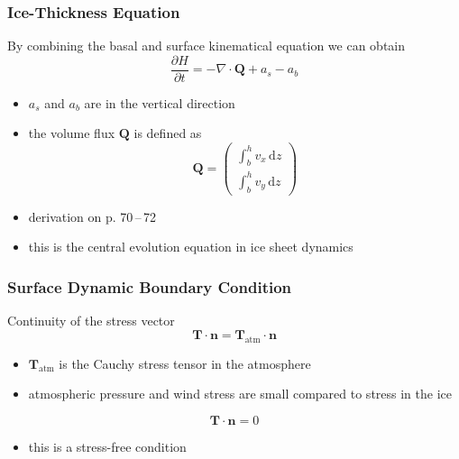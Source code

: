 \documentclass[hide notes,intlimits]{beamer}
\begin{document}
\begin{frame}
  \frametitle{Ice-Thickness Equation}
  By combining the basal and surface kinematical equation we can obtain
  \begin{equation}
    \frac{\partial H}{\partial t} = - \nabla \cdot \mathbf{Q} + a_{s} - a_{b}
  \end{equation}
    \begin{itemize}
    \item $ a_{s}$ and $a_{b}$ are in the vertical direction
    \item the volume flux $\mathbf{Q}$ is defined as
      \begin{equation*}
        \mathbf{Q} =
        \left(
          \begin{array}{c}
            \int_{b}^{h} v_{x} \,\text{d} z \\[.25em]
          \int_{b}^{h} v_{y} \,\text{d} z
        \end{array}
      \right)
    \end{equation*}
  \item derivation on p. 70\,--\,72
  \item this is the central evolution equation in ice sheet dynamics
  \end{itemize}
\end{frame}





\begin{frame}
  \frametitle{Surface Dynamic Boundary Condition}
  Continuity of the stress vector
  \begin{equation}
    \mathbf{T}\cdot\mathbf{n} = \mathbf{T}_{\text{atm}}\cdot\mathbf{n}
  \end{equation}
  \begin{itemize}
  \item $\mathbf{T}_{\text{atm}}$ is the Cauchy stress tensor in the atmosphere
  \item atmospheric pressure and wind stress are small compared to stress in the ice
  \end{itemize}
  \begin{equation}
    \mathbf{T}\cdot\mathbf{n} = 0
  \end{equation}
  \begin{itemize}
  \item this is a \alert{stress-free condition}
  \end{itemize}
\end{frame}
\end{document}
